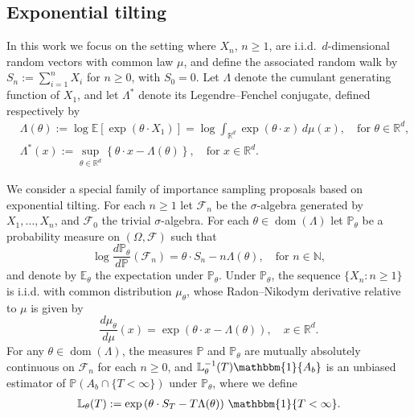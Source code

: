\documentclass[aap,preprint]{imsart}
\newcommand{\Pro}{{\mathbb{P}}}
\newcommand{\Exp}{{\mathbb{E}}}
\newcommand{\cF}{\mathcal{F}}
\theoremstyle{plain}
\theoremstyle{definition}
\begin{document}
\subsection{Exponential tilting}
In this work we focus on the setting where $X_n$, $n \geq 1$, are i.i.d.~$d$-dimensional random vectors with common law $\mu$, and define the associated random walk by $S_n := \sum_{i=1}^{n} X_i$ for $n \geq 0$, with $S_0 = 0$. Let $\Lambda$ denote the cumulant generating function of $X_1$, and let $\Lambda^*$ denote its Legendre--Fenchel conjugate, defined respectively by
\begin{align*}
&\Lambda(\theta) := \log \Exp\left[ \exp\left( \theta \cdot X_1 \right) \right] = \log \int_{\mathbb{R}^d} \exp( \theta \cdot x ) \, d\mu(x), \quad \text{for } \theta \in \mathbb{R}^d, \\
&\Lambda^*(x) := \sup_{\theta \in \mathbb{R}^d} \left\{ \theta \cdot x - \Lambda(\theta) \right\}, \quad \text{for } x \in \mathbb{R}^d.
\end{align*}

We consider a special family of importance sampling proposals based on exponential tilting. 
For each $n \geq 1$  let $\cF_n$ be the $\sigma$-algebra generated by $X_1, \ldots, X_n$, and  $\cF_0$  the trivial $\sigma$-algebra. 
For each $\theta \in \operatorname{dom}(\Lambda)$  let $\Pro_{\theta}$ be a probability measure on $(\Omega, \mathcal{F})$ such that
\begin{equation}\label{def:exp_tilting}
\log \frac{d\Pro_{\theta}}{d\Pro}(\mathcal{F}_{n}) = \theta \cdot S_n - n \Lambda(\theta), \quad \text{for } n \in \mathbb{N},
\end{equation}
and denote by $\Exp_{\theta}$ the expectation under $\Pro_{\theta}$. Under $\Pro_{\theta}$, the sequence $\{X_n : n \geq 1\}$ is i.i.d. with common distribution $\mu_{\theta}$, whose Radon--Nikodym derivative relative to $\mu$ is given by
\begin{equation}\label{def:exp_tilting_common_dist}
\frac{d\mu_{\theta}}{d\mu}(x) = \exp\left( \theta \cdot x - \Lambda(\theta) \right), \quad x \in \mathbb{R}^d.
\end{equation}
For any $\theta \in \operatorname{dom}(\Lambda)$, the measures $\Pro$ and $\Pro_{\theta}$ are mutually absolutely continuous on $\mathcal{F}_n$ for each $n \geq 0$, and $\mathbb{L}_{\theta}^{-1}(T) \mathbbm{1}\{A_b\}$ is an unbiased estimator of  $\Pro\left(A_b \cap \{T < \infty\} \right)$ under $\Pro_{\theta}$, where we define
\begin{align}\label{def:LR_theta}
   \mathbb{L}_{\theta}(T) := \exp\left( \theta \cdot S_{T} - T \Lambda(\theta) \right) \, \mathbbm{1}\{T < \infty\}.
\end{align}
\end{document}
